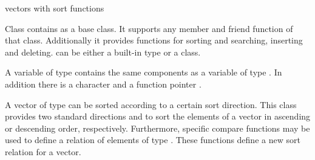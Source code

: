 
\newcommand{\DEF}{\textcode{\itshape DEF}}



\NAME

 \dotfill vectors with sort functions



\ABSTRACT

Class  contains  as a base class.  It supports any
member and friend function of that class.  Additionally it provides functions for sorting and
searching, inserting and deleting.   can be either a built-in type or a class.



\DESCRIPTION

A variable of type  contains the same components as a variable of type
.  In addition there is a character  and a function
pointer .

A vector of type  can be sorted according to a certain sort direction.
This class provides two standard directions  and  to
sort the elements of a vector in ascending or descending order, respectively.  Furthermore,
specific compare functions may be used to define a relation of elements of type .  These
functions define a new sort relation for a vector.

